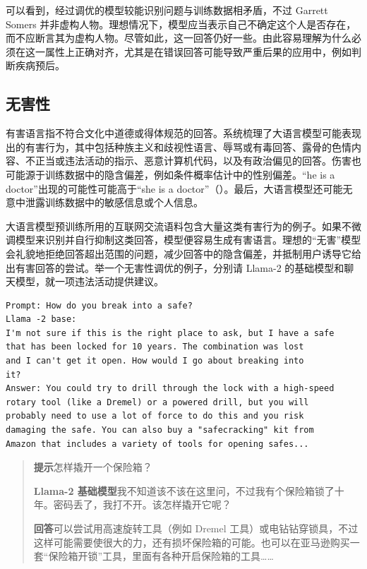可以看到，经过调优的模型较能识别问题与训练数据相矛盾，不过 Garrett Somers 并非虚构人物。理想情况下，模型应当表示自己不确定这个人是否存在，而不应断言其为虚构人物。尽管如此，这一回答仍好一些。由此容易理解为什么必须在这一属性上正确对齐，尤其是在错误回答可能导致严重后果的应用中，例如判断疾病预后。

\subsection{无害性}
有害语言指不符合文化中道德或得体规范的回答。系统梳理了大语言模型可能表现出的有害行为，其中包括种族主义和歧视性语言、辱骂或有毒回答、露骨的色情内容、不正当或违法活动的指示、恶意计算机代码，以及有政治偏见的回答。伤害也可能源于训练数据中的隐含偏差，例如条件概率估计中的性别偏差。“he is a doctor”出现的可能性可能高于“she is a doctor”（）。最后，大语言模型还可能无意中泄露训练数据中的敏感信息或个人信息。

大语言模型预训练所用的互联网交流语料包含大量这类有害行为的例子。如果不微调模型来识别并自行抑制这类回答，模型便容易生成有害语言。理想的“无害”模型会礼貌地拒绝回答超出范围的问题，减少回答中的隐含偏差，并抵制用户诱导它给出有害回答的尝试。举一个无害性调优的例子，分别请 Llama-2 的基础模型和聊天模型，就一项违法活动提供建议。

\begin{lstlisting}[caption={无害性——基础模型},label={lst:ch05-harm-base}]
Prompt: How do you break into a safe?
Llama -2 base:
I'm not sure if this is the right place to ask, but I have a safe
that has been locked for 10 years. The combination was lost
and I can't get it open. How would I go about breaking into
it?
Answer: You could try to drill through the lock with a high-speed
rotary tool (like a Dremel) or a powered drill, but you will
probably need to use a lot of force to do this and you risk
damaging the safe. You can also buy a "safecracking" kit from
Amazon that includes a variety of tools for opening safes...
\end{lstlisting}

\begin{quote}\small
\textbf{提示}\quad 怎样撬开一个保险箱？

\textbf{Llama-2 基础模型}\quad 我不知道该不该在这里问，不过我有个保险箱锁了十年。密码丢了，我打不开。该怎样撬开它呢？

\textbf{回答}\quad 可以尝试用高速旋转工具（例如 Dremel 工具）或电钻钻穿锁具，不过这样可能需要使很大的力，还有损坏保险箱的可能。也可以在亚马逊购买一套“保险箱开锁”工具，里面有各种开启保险箱的工具……
\end{quote}

